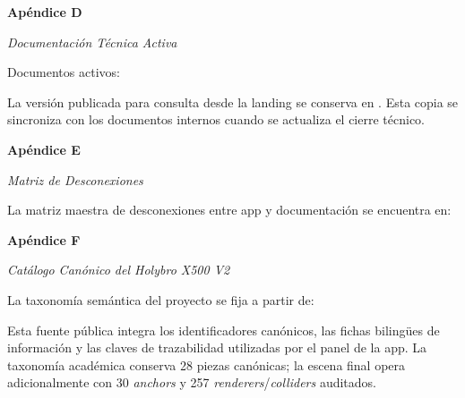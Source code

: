\clearpage
{}
\label{apendice:D}
{\noindent\textbf{Apéndice D}\par
\noindent\textit{Documentación Técnica Activa}\par}

Documentos activos:







La versión publicada para consulta desde la landing se conserva en . Esta copia se sincroniza con los documentos internos cuando se actualiza el cierre técnico.

\clearpage
{}
\label{apendice:E}
{\noindent\textbf{Apéndice E}\par
\noindent\textit{Matriz de Desconexiones}\par}

La matriz maestra de desconexiones entre app y documentación se encuentra en:
\begin{center}
\end{center}

\clearpage
{}
\label{apendice:F}
{\noindent\textbf{Apéndice F}\par
\noindent\textit{Catálogo Canónico del Holybro X500 V2}\par}

La taxonomía semántica del proyecto se fija a partir de:
\begin{center}
\end{center}

Esta fuente pública integra los identificadores canónicos, las fichas bilingües de información y las claves de trazabilidad utilizadas por el panel de la app. La taxonomía académica conserva 28 piezas canónicas; la escena final opera adicionalmente con 30 \textit{anchors} y 257 \textit{renderers}/\textit{colliders} auditados.

